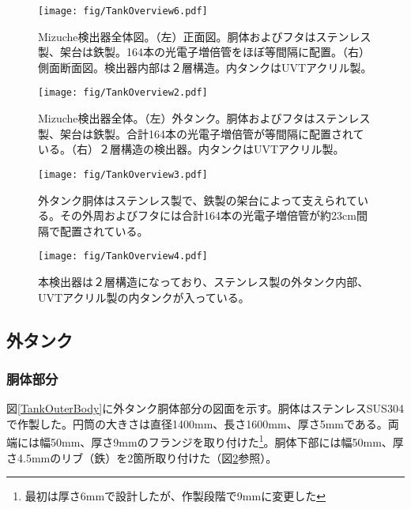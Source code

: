 \documentclass[11pt]{jreport}
\newcommand{\figref}[1]{図\ref{#1}}
\begin{document}
\begin{figure}[htbp]
\centering
\texttt{[image: fig/TankOverview6.pdf]}
\caption[Mizuche検出器全体図]{Mizuche検出器全体図。（左）正面図。胴体およびフタはステンレス製、架台は鉄製。164本の光電子増倍管をほぼ等間隔に配置。（右）側面断面図。検出器内部は２層構造。内タンクはUVTアクリル製。}
\label{TankOverview}
\end{figure}

\begin{figure}[htbp]
\centering
\texttt{[image: fig/TankOverview2.pdf]}
\caption[Mizuche検出器全体]{Mizuche検出器全体。（左）外タンク。胴体およびフタはステンレス製、架台は鉄製。合計164本の光電子増倍管が等間隔に配置されている。（右）２層構造の検出器。内タンクはUVTアクリル製。}
\label{TankOverview}
\end{figure}
\fi%


\begin{figure}[htbp]
\begin{minipage}{0.47\textwidth}
\centering
\texttt{[image: fig/TankOverview3.pdf]}
\caption[Mizuche検出器の外観]{外タンク胴体はステンレス製で、鉄製の架台によって支えられている。その外周およびフタには合計164本の光電子増倍管が約23cm間隔で配置されている。}
\label{fig:one}
\end{minipage}
\hfil
\begin{minipage}{0.47\textwidth}
\centering
\texttt{[image: fig/TankOverview4.pdf]}
\caption[Mizuche検出器の外観（フタを取った状態）]{本検出器は２層構造になっており、ステンレス製の外タンク内部、UVTアクリル製の内タンクが入っている。}
\label{fig:two}
\end{minipage}
\end{figure}
\fi%

\subsection{外タンク}

\subsubsection{胴体部分}

\figref{TankOuterBody}に外タンク胴体部分の図面を示す。胴体はステンレスSUS304で作製した。円筒の大きさは直径1400mm、長さ1600mm、厚さ5mmである。両端には幅50mm、厚さ9mmのフランジを取り付けた\footnote{最初は厚さ6mmで設計したが、作製段階で9mmに変更した}。胴体下部には幅50mm、厚さ4.5mmのリブ（鉄）を2箇所取り付けた（\figref{TankOverview}参照）。
\end{document}
